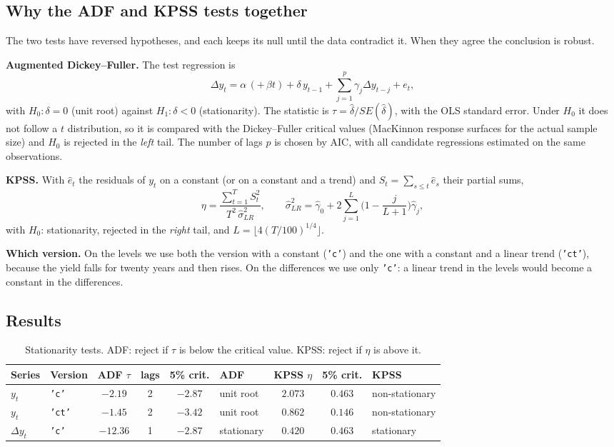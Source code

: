 \documentclass[11pt,a4paper]{article}
\begin{document}
\subsection{Why the ADF and KPSS tests together}

The two tests have reversed hypotheses, and each keeps its null until the data contradict it. When they agree the conclusion is robust.

\textbf{Augmented Dickey--Fuller.} The test regression is
\begin{equation}
\Delta y_t = \alpha \,(+\, \beta t) + \delta\, y_{t-1} + \sum_{j=1}^{p}\gamma_j \Delta y_{t-j} + e_t,
\end{equation}
with $H_0: \delta = 0$ (unit root) against $H_1: \delta < 0$ (stationarity). The statistic is $\tau = \hat\delta/SE(\hat\delta)$, with the OLS standard error. Under $H_0$ it does not follow a $t$ distribution, so it is compared with the Dickey--Fuller critical values (MacKinnon response surfaces for the actual sample size) and $H_0$ is rejected in the \emph{left} tail. The number of lags $p$ is chosen by AIC, with all candidate regressions estimated on the same observations.

\textbf{KPSS.} With $\hat e_t$ the residuals of $y_t$ on a constant (or on a constant and a trend) and $S_t = \sum_{s\le t}\hat e_s$ their partial sums,
\begin{equation}
\eta = \frac{\sum_{t=1}^{T} S_t^2}{T^2\,\hat\sigma^2_{LR}}, \qquad \hat\sigma^2_{LR} = \hat\gamma_0 + 2\sum_{j=1}^{L}\Big(1 - \frac{j}{L+1}\Big)\hat\gamma_j,
\end{equation}
with $H_0$: stationarity, rejected in the \emph{right} tail, and $L = \lfloor 4(T/100)^{1/4}\rfloor$.

\textbf{Which version.} On the levels we use both the version with a constant (\texttt{'c'}) and the one with a constant and a linear trend (\texttt{'ct'}), because the yield falls for twenty years and then rises. On the differences we use only \texttt{'c'}: a linear trend in the levels would become a constant in the differences.

\subsection{Results}

\begin{table}[H]
\centering
\small
\begin{tabular}{llcccl|ccl}
\toprule
Series & Version & ADF $\tau$ & lags & 5\% crit. & ADF & KPSS $\eta$ & 5\% crit. & KPSS \\
\midrule
$y_t$ & \texttt{'c'} & $-2.19$ & 2 & $-2.87$ & unit root & $2.073$ & $0.463$ & non-stationary \\
$y_t$ & \texttt{'ct'} & $-1.45$ & 2 & $-3.42$ & unit root & $0.862$ & $0.146$ & non-stationary \\
$\Delta y_t$ & \texttt{'c'} & $-12.36$ & 1 & $-2.87$ & stationary & $0.420$ & $0.463$ & stationary \\
\bottomrule
\end{tabular}
\caption{Stationarity tests. ADF: reject if $\tau$ is below the critical value. KPSS: reject if $\eta$ is above it.}
\end{table}
\end{document}
